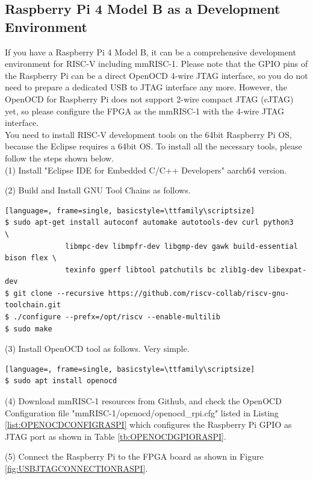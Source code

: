 \subsection{Raspberry Pi 4 Model B as a Development Environment}

If you have a Raspberry Pi 4 Model B, it can be a comprehensive development environment for RISC-V including mmRISC-1. Please note that the GPIO pins of the Raspberry Pi can be a direct OpenOCD 4-wire JTAG interface, so you do not need to prepare a dedicated USB to JTAG interface any more. However, the OpenOCD for Raspberry Pi does not support 2-wire compact JTAG (cJTAG) yet, so please configure the FPGA as the mmRISC-1 with the 4-wire JTAG interface.\\
You need to install RISC-V development tools on the 64bit Raspberry Pi OS, because the Eclipse requires a 64bit OS. To install all the necessary tools, please follow the steps shown below.\\

(1) Install "Eclipse IDE for Embedded C/C++ Developers" aarch64 version.

(2) Build and Install GNU Tool Chains as follows.

\begin{lstlisting}[language=, frame=single, basicstyle=\ttfamily\scriptsize]
$ sudo apt-get install autoconf automake autotools-dev curl python3             \
              libmpc-dev libmpfr-dev libgmp-dev gawk build-essential bison flex \
              texinfo gperf libtool patchutils bc zlib1g-dev libexpat-dev
$ git clone --recursive https://github.com/riscv-collab/riscv-gnu-toolchain.git
$ ./configure --prefx=/opt/riscv --enable-multilib
$ sudo make
\end{lstlisting}

(3) Install OpenOCD tool as follows. Very simple.

\begin{lstlisting}[language=, frame=single, basicstyle=\ttfamily\scriptsize]
$ sudo apt install openocd
\end{lstlisting}

(4) Download mmRISC-1 resources from Github, and check the OpenOCD Configuration file "mmRISC-1/openocd/openocd\_rpi.cfg" listed in Listing \ref{list:OPENOCDCONFIGRASPI} which configures the Raspberry Pi GPIO as JTAG port as shown in Table \ref{tb:OPENOCDGPIORASPI}. 

(5) Connect the Raspberry Pi to the FPGA board as shown in Figure \ref{fig:USBJTAGCONNECTIONRASPI}.

